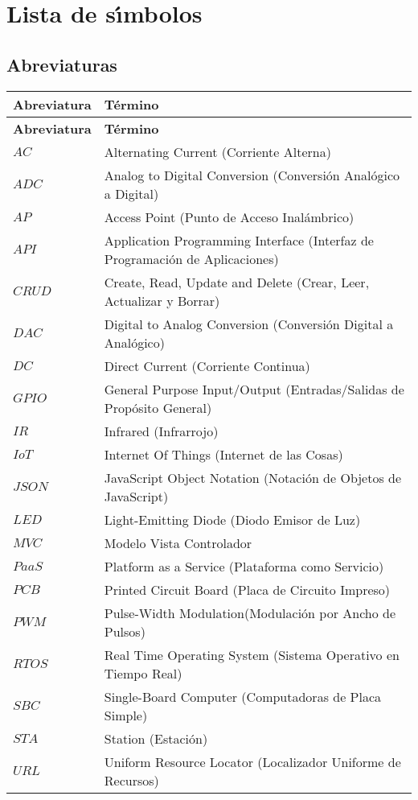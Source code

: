 \chapter*{Lista de s\'{\i}mbolos}

\section*{Abreviaturas}
\begin{longtable}[l]{>{}l<{}l}
  \textbf{Abreviatura} & \textbf{T\'{e}rmino} \\[0.5ex] \hline%
  \endfirsthead%
  \textbf{Abreviatura} & \textbf{T\'{e}rmino} \\[0.5ex] \hline%
  \endhead%
\renewcommand{\arraystretch}{1.4}\label{simbolosg}
 $AC$    &Alternating Current (Corriente Alterna)\\%
 $ADC$	 &Analog to Digital Conversion (Conversión Analógico a Digital)\\%
 $AP$	 &Access Point (Punto de Acceso Inalámbrico)\\%
 $API$	 &Application Programming Interface (Interfaz de Programación de Aplicaciones)\\%
 $CRUD$  &Create, Read, Update and Delete (Crear, Leer, Actualizar y Borrar)\\%
 $DAC$	 &Digital to Analog Conversion (Conversión Digital a Analógico)\\%
 $DC$    &Direct Current (Corriente Continua)\\%
 $GPIO$  &General Purpose Input/Output (Entradas/Salidas de Propósito General)\\%
 $IR$    &Infrared (Infrarrojo)\\%
 $IoT$   &Internet Of Things (Internet de las Cosas)\\%
 $JSON$  &JavaScript Object Notation (Notación de Objetos de JavaScript)\\%
 $LED$	 &Light-Emitting Diode (Diodo Emisor de Luz)\\%
 $MVC$	 &Modelo Vista Controlador\\%
 $PaaS$  &Platform as a Service (Plataforma como Servicio)\\%
 $PCB$	 &Printed Circuit Board (Placa de Circuito Impreso)\\%
 $PWM$	 &Pulse-Width Modulation(Modulación por Ancho de Pulsos)\\%
 $RTOS$	 &Real Time Operating System (Sistema Operativo en Tiempo Real)\\%
 $SBC$   &Single-Board Computer (Computadoras de Placa Simple)\\%
 $STA$	 &Station (Estación)\\%
 $URL$	 &Uniform Resource Locator (Localizador Uniforme de Recursos)\\%

\end{longtable}


\setlength{\extrarowheight}{0pt}